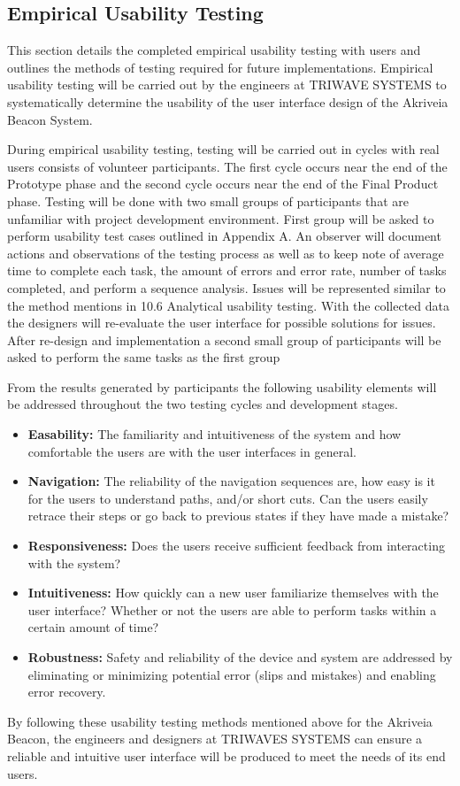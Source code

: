 

\subsection{Empirical Usability Testing}
\medskip
This section details the completed empirical usability testing with users and outlines the methods of testing required for future implementations. Empirical usability testing will be carried out by the engineers at TRIWAVE SYSTEMS to systematically determine the usability of the user interface design of the Akriveia Beacon System. 

\bigskip
During empirical usability testing, testing will be carried out in cycles with real users consists of volunteer participants. The first cycle occurs near the end of the Prototype phase and the second cycle occurs near the end of the Final Product phase. Testing will be done with two small groups of participants that are unfamiliar with project development environment. First group will be asked to perform usability test cases outlined in Appendix A. An observer will document actions and observations of the testing process as well as to keep note of average time to complete each task, the amount of errors and error rate, number of tasks completed, and perform a sequence analysis. Issues will be represented similar to the method mentions in 10.6 Analytical usability testing. With the collected data the designers will re-evaluate the user interface for possible solutions for issues. After re-design and implementation a second small group of participants will be asked to perform the same tasks as the first group

\bigskip
From the results generated by participants the following usability elements will be addressed throughout the two testing cycles and development stages. 

\medskip

\begin{itemize}
\setlength\itemsep{0.1mm}
	\item \textbf{Easability:} The familiarity and intuitiveness of the system and how comfortable the users are with the user interfaces in general. 
	\item \textbf{Navigation:} The reliability of the navigation sequences are, how easy is it for the users to understand paths, and/or short cuts. Can the users easily retrace their steps or go back to previous states if they have made a mistake?
	\item \textbf{Responsiveness:} Does the users receive sufficient feedback from interacting with the system? 
	\item \textbf{Intuitiveness:} How quickly can a new user familiarize themselves with the user interface? Whether or not the users are able to perform tasks within a certain amount of time?
	\item \textbf{Robustness:} Safety and reliability of the device and system are addressed by eliminating or minimizing potential error (slips and mistakes) and enabling error recovery.
\end{itemize}

\medskip
By following these usability testing methods mentioned above for the Akriveia Beacon, the engineers and designers at TRIWAVES SYSTEMS can ensure a reliable and intuitive user interface will be produced to meet the needs of its end users. 
